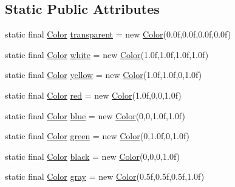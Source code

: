 \subsection*{Static Public Attributes}
\begin{DoxyCompactItemize}
\item 
static final \mbox{\hyperlink{classorg_1_1newdawn_1_1slick_1_1_color}{Color}} \mbox{\hyperlink{classorg_1_1newdawn_1_1slick_1_1_color_a146c5e73ed9a375d2e35a4e0d89d7b4f}{transparent}} = new \mbox{\hyperlink{classorg_1_1newdawn_1_1slick_1_1_color}{Color}}(0.\+0f,0.\+0f,0.\+0f,0.\+0f)
\item 
static final \mbox{\hyperlink{classorg_1_1newdawn_1_1slick_1_1_color}{Color}} \mbox{\hyperlink{classorg_1_1newdawn_1_1slick_1_1_color_afcd91cbdd26233d226d734f70dca3d2e}{white}} = new \mbox{\hyperlink{classorg_1_1newdawn_1_1slick_1_1_color}{Color}}(1.\+0f,1.\+0f,1.\+0f,1.\+0f)
\item 
static final \mbox{\hyperlink{classorg_1_1newdawn_1_1slick_1_1_color}{Color}} \mbox{\hyperlink{classorg_1_1newdawn_1_1slick_1_1_color_af5e19b81adfda22915b71d3a8e7fe6be}{yellow}} = new \mbox{\hyperlink{classorg_1_1newdawn_1_1slick_1_1_color}{Color}}(1.\+0f,1.\+0f,0,1.\+0f)
\item 
static final \mbox{\hyperlink{classorg_1_1newdawn_1_1slick_1_1_color}{Color}} \mbox{\hyperlink{classorg_1_1newdawn_1_1slick_1_1_color_aa9735c6217da1b515582e7f2273daeb6}{red}} = new \mbox{\hyperlink{classorg_1_1newdawn_1_1slick_1_1_color}{Color}}(1.\+0f,0,0,1.\+0f)
\item 
static final \mbox{\hyperlink{classorg_1_1newdawn_1_1slick_1_1_color}{Color}} \mbox{\hyperlink{classorg_1_1newdawn_1_1slick_1_1_color_af55c4f4e0af464d15cf85939058f4567}{blue}} = new \mbox{\hyperlink{classorg_1_1newdawn_1_1slick_1_1_color}{Color}}(0,0,1.\+0f,1.\+0f)
\item 
static final \mbox{\hyperlink{classorg_1_1newdawn_1_1slick_1_1_color}{Color}} \mbox{\hyperlink{classorg_1_1newdawn_1_1slick_1_1_color_a1cd4406bbd518aeb8baefcf19df24424}{green}} = new \mbox{\hyperlink{classorg_1_1newdawn_1_1slick_1_1_color}{Color}}(0,1.\+0f,0,1.\+0f)
\item 
static final \mbox{\hyperlink{classorg_1_1newdawn_1_1slick_1_1_color}{Color}} \mbox{\hyperlink{classorg_1_1newdawn_1_1slick_1_1_color_ac9ec721980ab1c388e82e2f8e584f002}{black}} = new \mbox{\hyperlink{classorg_1_1newdawn_1_1slick_1_1_color}{Color}}(0,0,0,1.\+0f)
\item 
static final \mbox{\hyperlink{classorg_1_1newdawn_1_1slick_1_1_color}{Color}} \mbox{\hyperlink{classorg_1_1newdawn_1_1slick_1_1_color_a51bc0a8031fa678db5b35c26696b1d9f}{gray}} = new \mbox{\hyperlink{classorg_1_1newdawn_1_1slick_1_1_color}{Color}}(0.\+5f,0.\+5f,0.\+5f,1.\+0f)

\end{DoxyCompactItemize}
